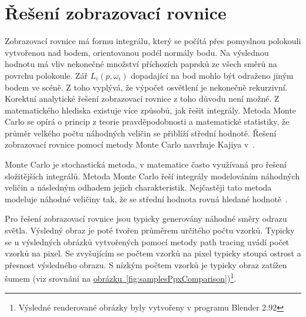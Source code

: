 \documentclass[czech,master]{diploma}
\newcommand{\point}{p}
\newcommand{\inVec}{\omega_{i}}
\newcommand{\inRadiance}{L_i\left(\point,\inVec\right)}
\begin{document}
\section{Řešení zobrazovací rovnice}
Zobrazovací rovnice má formu integrálu, který se počítá přes pomyslnou polokouli vytvořenou nad bodem, orientovanou podél normály bodu. Na výslednou hodnotu má vliv nekonečné množství příchozích paprsků ze všech směrů na povrchu polokoule. Zář \(\inRadiance\) dopadající na bod mohlo být odraženo jiným bodem ve scéně. Z toho vyplývá, že výpočet osvětlení je nekonečně rekurzivní. Korektní analytické řešení zobrazovací rovnice z toho důvodu není možné. Z matematického hlediska existuje více způsobů, jak řešit integrály. Metoda Monte Carlo se opírá o princip z teorie pravděpodobnosti a matematické statistiky, že průměr velkého počtu náhodných veličin se přiblíží střední hodnotě. Řešení zobrazovací rovnice pomocí metody Monte Carlo navrhuje Kajiya v~\cite{KajiyaRenderEq}.\par
Monte Carlo je stochastická metoda, v matematice často využívaná pro řešení složitějších integrálů. Metoda Monte Carlo řeší integrály modelováním náhodných veličin a následným odhadem jejich charakteristik. Nejčastěji tato metoda modeluje náhodné veličiny tak, že se střední hodnota rovná hledané hodnotě~\cite{MonteCarlo}.\par
Pro řešení zobrazovací rovnice jsou typicky generovány náhodné směry odrazu světla. Výsledný obraz je poté tvořen průměrem určitého počtu vzorků. Typicky se u výsledných obrázků vytvořených pomocí metody path tracing uvádí počet vzorků na pixel. Se zvyšujícím se počtem vzorků na pixel typicky stoupá ostrost a přesnost výsledného obrazu. S nízkým počtem vzorků je typicky obraz zatížen šumem (viz srovnání na \hyperref[fig:samplesPpxComparison]{obrázku~\ref{fig:samplesPpxComparison}})\footnote{Výsledné renderované obrázky byly vytvořeny v programu Blender 2.92}.
\end{document}
